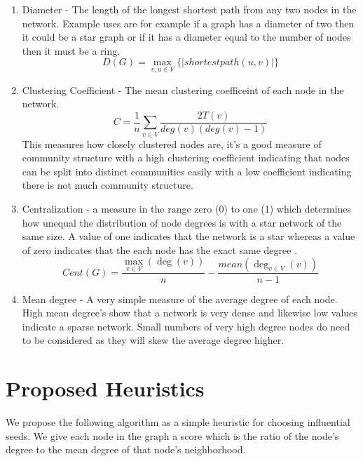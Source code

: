 \documentclass{article}
\begin{document}
\begin{enumerate}
	\item Diameter - The length of the longest shortest path from any two nodes in the network. Example uses are for example if a graph has a diameter of two then it could be a star graph or if it has a diameter equal to the number of nodes then it must be a ring.
	      \begin{equation}
		      D(G) = \max_{v, u \in V} \{ |shortestpath(u, v)| \}
	      \end{equation}
	\item Clustering Coefficient - The mean clustering coefficeint of each node in the network.
	      \begin{equation}
		      C = \frac{1}{n} \sum_{v \in V} {\frac{2T(v)}{deg(v)(deg(v)-1)}}
	      \end{equation}
	      This measures how closely clustered nodes are, it's a good measure of community structure with a high clustering coefficient indicating that nodes can be split into distinct communities easily with a low coefficient indicating there is not much community structure.
	\item Centralization - a measure in the range zero (0) to one (1) which determines how unequal the distribution of node degrees is with a star network of the same size. A value of one indicates that the network is a star whereas a value of zero indicates that the each node has the exact same degree \cite{franks2014learning}.
	      $$
		      Cent(G) = \frac{\max_{v \in V}(\deg (v))}{n} - \frac{mean(\deg_{v \in V}(v))}{n-1}
	      $$
	\item Mean degree - A very simple measure of the average degree of each node. High mean degree's show that a network is very dense and likewise low values indicate a sparse network. Small numbers of very high degree nodes do need to be considered as they will skew the average degree higher.
\end{enumerate}

\newpage


\newpage
\section{Proposed Heuristics}

We propose the following algorithm as a simple heuristic for choosing influential seeds.
We give each node in the graph a score which is the ratio of the node's degree to the mean degree of that node's neighborhood.
\end{document}
